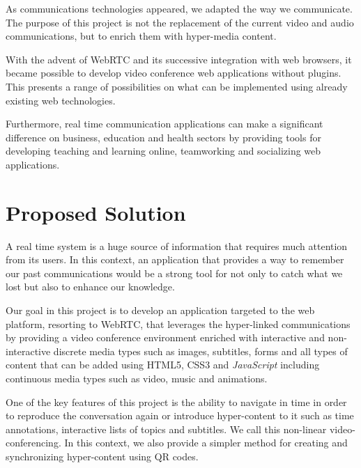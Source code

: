 	As communications technologies appeared, we adapted the way we communicate. The purpose of this project is not the replacement of the current video and audio communications, but to enrich them with hyper-media content. 

	With the advent of WebRTC and its successive integration with web browsers, it became possible to develop video conference web applications without plugins. This presents a range of possibilities on what can be implemented using already existing web technologies.
		
    Furthermore, real time communication applications can make a significant difference on business, education and health sectors by providing tools for developing teaching and learning online, teamworking and socializing web applications.



\section{Proposed Solution}
\label{section:proposed}

        
	A real time system is a huge source of information that requires much attention from its users. In this context, an application that provides a way to remember our past communications would be a strong tool for not only to catch what we lost but also to enhance our knowledge.

	Our goal in this project is to develop an application targeted to the web platform, resorting to \ac{WebRTC}, that leverages the hyper-linked communications by providing a video conference environment enriched with interactive and non-interactive discrete media types such as images, subtitles, forms and all types of content that can be added using \ac{HTML}5, \ac{CSS}3 and \emph{JavaScript} including continuous media types such as video, music and animations.

	One of the key features of this project is the ability to navigate in time in order to reproduce the conversation again or introduce hyper-content to it such as time annotations, interactive lists of topics and subtitles. We call this non-linear video-conferencing. In this context, we also provide a simpler method for creating and synchronizing hyper-content using \ac{QR} codes.

